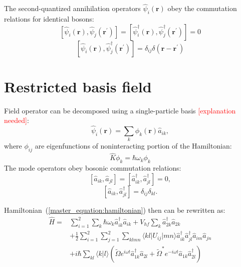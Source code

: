 \documentclass[12pt,notitlepage]{report}
\begin{document}
The second-quantized annihilation operators $\hat{\psi}_i (\mathbf{r})$ obey the commutation relations for identical bosons:
\[
\left[ \hat{\psi}_i(\mathbf{r}), \hat{\psi}_j(\mathbf{r}^\prime) \right] =
\left[ \hat{\psi}_i^\dagger(\mathbf{r}), \hat{\psi}_j^\dagger(\mathbf{r}^\prime) \right] = 0
\]
\[
\left[ \hat{\psi}_i(\mathbf{r}), \hat{\psi}_j^\dagger(\mathbf{r}^\prime) \right] = \delta_{ij} \delta(\mathbf{r} - \mathbf{r}^\prime)
\]

\section{Restricted basis field}

Field operator can be decomposed using a single-particle basis \textcolor{red}{[explanation needed]}:
\[ \hat{\psi}_i(\mathbf{r}) = \sum\limits_k \phi_{k}(\mathbf{r}) \hat{a}_{ik}, \]
where $\phi_{ij}$ are eigenfunctions of noninteracting portion of the Hamiltonian:
\[ \hat{K} \phi_{k} = \hbar \omega_{k} \phi_{k} \]
The mode operators obey bosonic commutation relations:
\[ [ \hat{a}_{ik}, \hat{a}_{jl} ] = [ \hat{a}_{ik}^\dagger, \hat{a}_{jl}^\dagger ] = 0, \]
\[ [ \hat{a}_{ik}, \hat{a}_{jl}^\dagger ] = \delta_{ij} \delta_{kl} . \]

Hamiltonian~(\ref{master_equation:hamiltonian}) then can be rewritten as:
\begin{equation*}
\begin{split}
\hat{H} = &
	\sum\limits_{i=1}^2 \sum\limits_k \hbar \omega_{k} \hat{a}_{ik}^\dagger \hat{a}_{ik} +
	V_{hf} \sum\limits_k \hat{a}_{2k}^\dagger \hat{a}_{2k} \\
	& + \frac{1}{2} \sum\limits_{i=1}^2 \sum\limits_{j=1}^2 \sum\limits_{klmn}
		\langle kl \lvert U_{ij} \rvert mn \rangle
		\hat{a}_{ik}^\dagger \hat{a}_{jl}^\dagger \hat{a}_{im} \hat{a}_{jn} \\
	& + i \hbar \sum\limits_{kl} \langle k \vert l \rangle \left(
		\tilde{\Omega} e^{i \omega t} \hat{a}_{1k}^\dagger \hat{a}_{2l} +
		\tilde{\Omega}^* e^{-i \omega t} \hat{a}_{1k} \hat{a}_{2l}^\dagger
	\right)
\end{split}
\end{equation*}
\end{document}
